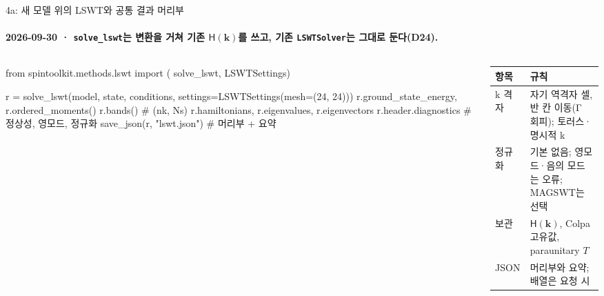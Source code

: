 \begin{frame}[fragile,label=stage4a-api]{4a: 새 모델 위의 LSWT와 공통 결과 머리부}
  \framesubtitle{2026-09-30 · \texttt{solve\_lswt}는 변환을 거쳐 기존 $\mathsf H(\mathbf k)$를 쓰고, 기존 \texttt{LSWTSolver}는 그대로 둔다(D24).}
  \begin{columns}[T,onlytextwidth]
    \begin{column}{0.52\textwidth}
\begin{semiverbatim}\scriptsize
from spintoolkit.methods.lswt import (
    solve_lswt, LSWTSettings)

r = solve_lswt(model, state, conditions,
               settings=LSWTSettings(mesh=(24, 24)))
r.ground_state_energy, r.ordered_moments()
r.bands()                  # (nk, Ns)
r.hamiltonians, r.eigenvalues, r.eigenvectors
r.header.diagnostics       # 정상성, 영모드, 정규화
save_json(r, "lswt.json")  # 머리부 + 요약
\end{semiverbatim}
    \end{column}
    \begin{column}{0.45\textwidth}
      \small
      \begin{tabular}{@{}P{1.6cm}P{3.4cm}@{}}
        \toprule
        항목 & 규칙 \\
        \midrule
        k 격자 & 자기 역격자 셀, 반 칸 이동(Γ 회피); 토러스·명시적 k \\
        정규화 & 기본 없음; 영모드·음의 모드는 오류; MAGSWT는 선택 \\
        보관 & $\mathsf H(\mathbf k)$, Colpa 고유값, paraunitary $T$ \\
        JSON & 머리부와 요약; 배열은 요청 시 \\
        \bottomrule
      \end{tabular}
    \end{column}
  \end{columns}
  \par\medskip
\end{frame}

